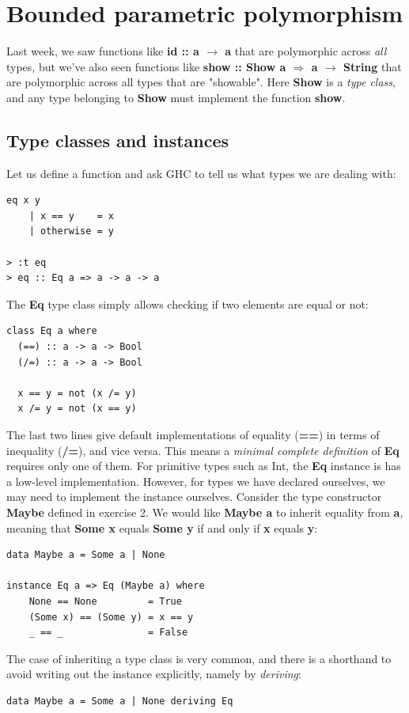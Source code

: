 \documentclass{article}
\begin{document}
\section{Bounded parametric polymorphism}
Last week, we saw functions like \textbf{id :: a $\rightarrow$ a} that are polymorphic across \emph{all} types, but we've also seen functions like \textbf{show :: Show a $\Rightarrow$ a $\rightarrow$ String} that are polymorphic across all types that are "showable". Here \textbf{Show} is a \emph{type class}, and any type belonging to \textbf{Show} must implement the function \textbf{show}.

\subsection{Type classes and instances}
Let us define a function and ask GHC to tell us what types we are dealing with:
\lstset{language=Haskell}
\begin{lstlisting}
eq x y
    | x == y    = x
    | otherwise = y
    
> :t eq
> eq :: Eq a => a -> a -> a
\end{lstlisting}
 The \textbf{Eq} type class simply allows checking if two elements are equal or not:
\begin{lstlisting}
class Eq a where
  (==) :: a -> a -> Bool
  (/=) :: a -> a -> Bool
  
  x == y = not (x /= y)
  x /= y = not (x == y)
\end{lstlisting}
The last two lines give default implementations of equality (\textbf{==}) in terms of inequality (\textbf{/=}), and vice versa. This means a \emph{minimal complete definition} of \textbf{Eq} requires only one of them. For primitive types such as Int, the \textbf{Eq} instance is has a low-level implementation. However, for types we have declared ourselves, we may need to implement the instance ourselves. Consider the type constructor \textbf{Maybe} defined in exercise 2. We would like \textbf{Maybe a} to inherit equality from \textbf{a}, meaning that \textbf{Some x} equals \textbf{Some y} if and only if \textbf{x} equals \textbf{y}:
\begin{lstlisting}
data Maybe a = Some a | None

instance Eq a => Eq (Maybe a) where
    None == None         = True
    (Some x) == (Some y) = x == y
    _ == _               = False
\end{lstlisting}
The case of inheriting a type class is very common, and there is a shorthand to avoid writing out the instance explicitly, namely by \emph{deriving}:
\begin{lstlisting}
data Maybe a = Some a | None deriving Eq
\end{lstlisting}
\end{document}
